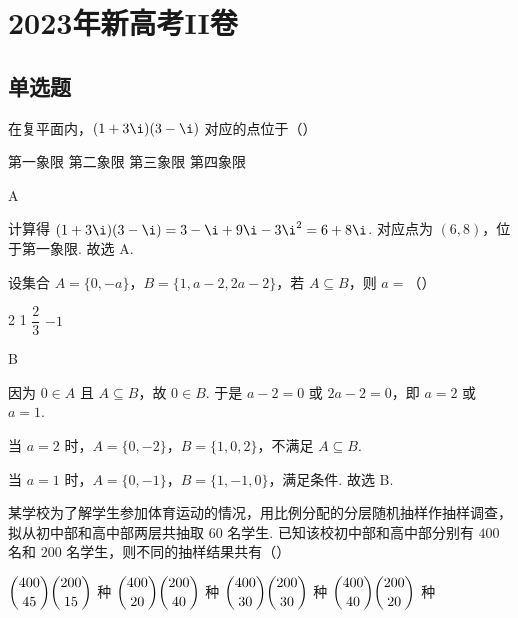 
\chapter{2023年新高考II卷}

\section{单选题}

\begin{problem}
在复平面内，\((1+3\i)(3-\i)\) 对应的点位于（\quad）

\choices
    {第一象限}
    {第二象限}
    {第三象限}
    {第四象限}
\end{problem}

\begin{answer}
A
\end{answer}

\begin{solution}
计算得 \((1+3\i)(3-\i)=3-\i+9\i-3\i^2=6+8\i\). 对应点为 \((6,8)\)，位于第一象限. 故选 A.
\end{solution}

\begin{problem}
设集合 \(A=\{0,-a\}\)，\(B=\{1,a-2,2a-2\}\)，若 \(A\subseteq B\)，则 \(a=\)（\quad）

\choices
    {2}
    {1}
    {\(\dfrac23\)}
    {\(-1\)}
\end{problem}

\begin{answer}
B
\end{answer}

\begin{solution}
因为 \(0\in A\) 且 \(A\subseteq B\)，故 \(0\in B\). 于是 \(a-2=0\) 或 \(2a-2=0\)，即 \(a=2\) 或 \(a=1\).

当 \(a=2\) 时，\(A=\{0,-2\}\)，\(B=\{1,0,2\}\)，不满足 \(A\subseteq B\).

当 \(a=1\) 时，\(A=\{0,-1\}\)，\(B=\{1,-1,0\}\)，满足条件. 故选 B.
\end{solution}

\begin{problem}
某学校为了解学生参加体育运动的情况，用比例分配的分层随机抽样作抽样调查，拟从初中部和高中部两层共抽取 \(60\) 名学生. 已知该校初中部和高中部分别有 \(400\) 名和 \(200\) 名学生，则不同的抽样结果共有（\quad）

\choices
    {\(\dbinom{400}{45}\dbinom{200}{15}\) 种}
    {\(\dbinom{400}{20}\dbinom{200}{40}\) 种}
    {\(\dbinom{400}{30}\dbinom{200}{30}\) 种}
    {\(\dbinom{400}{40}\dbinom{200}{20}\) 种}
\end{problem}

